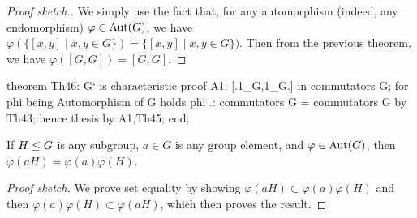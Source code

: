 \begin{proof}[Proof sketch.]
We simply use the fact that, for any automorphism (indeed, any
endomorphism) $\varphi\in\operatorname{Aut}(G)$, we have
$\varphi(\{[x,y]\mid x,y\in G\})=\{[x,y]\mid x,y\in G\})$. Then from the
previous theorem, we have $\varphi([G,G])=[G,G]$.
\end{proof}

\nwenddocs{}\endmoddef\nwstartdeflinemarkup{}\nwenddeflinemarkup
theorem Th46:
  G` is characteristic
proof
  A1: [.1_G,1_G.] in commutators G;
  for phi being Automorphism of G holds phi .: commutators G = commutators G
  by Th43;
  hence thesis by A1,Th45;
end;
\eatline
{}\nwendcode{}\nwdocspar
\begin{theorem}
If $H\leq G$ is any subgroup, $a\in G$ is any group element, and
$\varphi\in\operatorname{Aut}(G)$, then $\varphi(aH)=\varphi(a)\varphi(H)$.
\end{theorem}

\begin{proof}[Proof sketch]
We prove set equality by showing $\varphi(aH)\subset\varphi(a)\varphi(H)$ and then
$\varphi(a)\varphi(H)\subset\varphi(aH)$, which then proves the result.
\end{proof}

